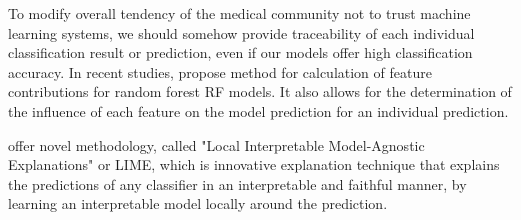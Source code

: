 To modify overall tendency of the medical community not to trust machine learning systems, we should somehow provide traceability of each individual classification result or prediction, even if our models offer high classification accuracy. In recent studies, \citet*{palczewska2014interpreting} propose method for calculation of feature contributions for random forest RF models. It also allows for the determination of the influence of each feature on the model prediction for an individual prediction.

\citet*{ribeiro2016should} offer novel methodology, called "Local Interpretable Model-Agnostic Explanations" or LIME, which is innovative explanation technique that explains the predictions of any classifier in an interpretable and faithful manner, by learning an interpretable model locally around the prediction. 







